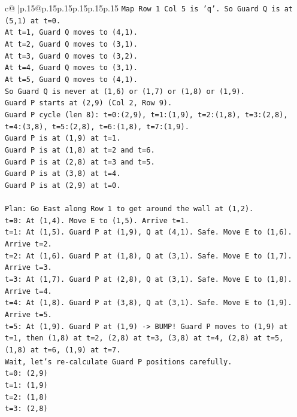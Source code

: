 \documentclass{article}
\begin{document}
{\begin{supertabular}{c@{$\;$}|p{.15\linewidth}@{}p{.15\linewidth}p{.15\linewidth}p{.15\linewidth}p{.15\linewidth}p{.15\linewidth}}
{{{\texttt{Map Row 1 Col 5 is 'q'. So Guard Q is at (5,1) at t=0.} \\
\texttt{At t=1, Guard Q moves to (4,1).} \\
\texttt{At t=2, Guard Q moves to (3,1).} \\
\texttt{At t=3, Guard Q moves to (3,2).} \\
\texttt{At t=4, Guard Q moves to (3,1).} \\
\texttt{At t=5, Guard Q moves to (4,1).} \\
\texttt{So Guard Q is never at (1,6) or (1,7) or (1,8) or (1,9).} \\
\texttt{Guard P starts at (2,9) (Col 2, Row 9).} \\
\texttt{Guard P cycle (len 8): t=0:(2,9), t=1:(1,9), t=2:(1,8), t=3:(2,8), t=4:(3,8), t=5:(2,8), t=6:(1,8), t=7:(1,9).} \\
\texttt{Guard P is at (1,9) at t=1.} \\
\texttt{Guard P is at (1,8) at t=2 and t=6.} \\
\texttt{Guard P is at (2,8) at t=3 and t=5.} \\
\texttt{Guard P is at (3,8) at t=4.} \\
\texttt{Guard P is at (2,9) at t=0.} \\
\\ 
\texttt{Plan: Go East along Row 1 to get around the wall at (1,2).} \\
\texttt{t=0: At (1,4). Move E to (1,5). Arrive t=1.} \\
\texttt{t=1: At (1,5). Guard P at (1,9), Q at (4,1). Safe. Move E to (1,6). Arrive t=2.} \\
\texttt{t=2: At (1,6). Guard P at (1,8), Q at (3,1). Safe. Move E to (1,7). Arrive t=3.} \\
\texttt{t=3: At (1,7). Guard P at (2,8), Q at (3,1). Safe. Move E to (1,8). Arrive t=4.} \\
\texttt{t=4: At (1,8). Guard P at (3,8), Q at (3,1). Safe. Move E to (1,9). Arrive t=5.} \\
\texttt{t=5: At (1,9). Guard P at (1,9) {-}> BUMP! Guard P moves to (1,9) at t=1, then (1,8) at t=2, (2,8) at t=3, (3,8) at t=4, (2,8) at t=5, (1,8) at t=6, (1,9) at t=7.} \\
\texttt{Wait, let's re{-}calculate Guard P positions carefully.} \\
\texttt{t=0: (2,9)} \\
\texttt{t=1: (1,9)} \\
\texttt{t=2: (1,8)} \\
\texttt{t=3: (2,8)} \\
}}}
\end{supertabular}}
\end{document}
